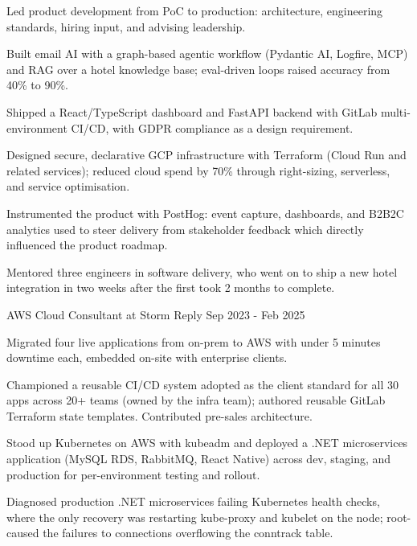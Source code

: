 \documentclass[10pt, a4paper]{awesome-cv}
\begin{document}
    \begin{cvitems}
        \item Led product development from PoC to production: architecture, engineering standards, hiring input, and advising leadership.
        \item Built email AI with a graph-based agentic workflow (Pydantic AI, Logfire, MCP) and RAG over a hotel knowledge base; eval-driven loops raised accuracy from 40\% to 90\%.
        \item Shipped a React/TypeScript dashboard and FastAPI backend with GitLab multi-environment CI/CD, with GDPR compliance as a design requirement.
        \item Designed secure, declarative GCP infrastructure with Terraform (Cloud Run and related services); reduced cloud spend by 70\% through right-sizing, serverless, and service optimisation.
        \item Instrumented the product with PostHog: event capture, dashboards, and B2B2C analytics used to steer delivery from stakeholder feedback which directly influenced the product roadmap.
        \item Mentored three engineers in software delivery, who went on to ship a new hotel integration in two weeks after the first took 2 months to complete.
    \end{cvitems}

    \cventry
    {AWS Cloud Consultant at Storm Reply}
    {Sep 2023 - Feb 2025}

    \begin{cvitems}
        \item Migrated four live applications from on-prem to AWS with under 5 minutes downtime each, embedded on-site with enterprise clients.
        \item Championed a reusable CI/CD system adopted as the client standard for all 30 apps across 20+ teams (owned by the infra team); authored reusable GitLab Terraform state templates. Contributed pre-sales architecture.
        \item Stood up Kubernetes on AWS with kubeadm and deployed a .NET microservices application (MySQL RDS, RabbitMQ, React Native) across dev, staging, and production for per-environment testing and rollout.
        \item Diagnosed production .NET microservices failing Kubernetes health checks, where the only recovery was restarting kube-proxy and kubelet on the node; root-caused the failures to connections overflowing the conntrack table.
    \end{cvitems}
\end{document}

